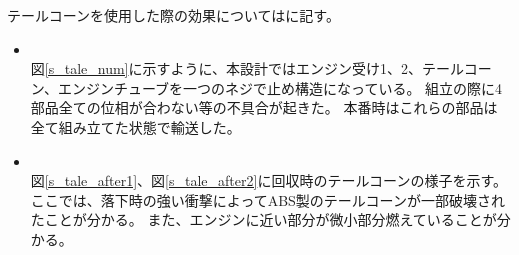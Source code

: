 \documentclass[a4paper,11pt,titlepage,uplatex]{jsarticle}
\begin{document}
テールコーンを使用した際の効果についてはに記す。
\begin{itemize}
    \item {}\\
    図\ref{s_tale_num}に示すように、本設計ではエンジン受け1、2、テールコーン、エンジンチューブを一つのネジで止め構造になっている。
    組立の際に4部品全ての位相が合わない等の不具合が起きた。
    本番時はこれらの部品は全て組み立てた状態で輸送した。
    
    \item {}\\
    図\ref{s_tale_after1}、図\ref{s_tale_after2}に回収時のテールコーンの様子を示す。
    ここでは、落下時の強い衝撃によってABS製のテールコーンが一部破壊されたことが分かる。
    また、エンジンに近い部分が微小部分燃えていることが分かる。
    

\end{itemize}
\end{document}
